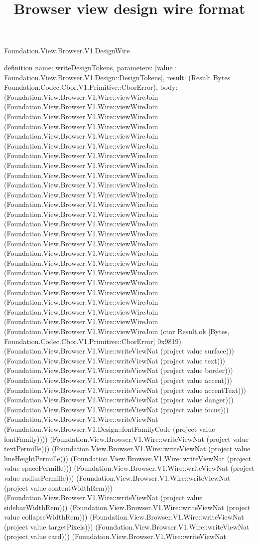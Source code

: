 \begin{lexlean}{Foundation.View.Browser.V1.DesignWire}
\title{Browser view design wire format}
\begin{semanticmodule}
definition{
  name: writeDesignTokens,
  parameters: [value : Foundation.View.Browser.V1.Design::DesignTokens],
  result: (Result Bytes Foundation.Codec.Cbor.V1.Primitive::CborError),
  body: (Foundation.View.Browser.V1.Wire::viewWireJoin (Foundation.View.Browser.V1.Wire::viewWireJoin (Foundation.View.Browser.V1.Wire::viewWireJoin (Foundation.View.Browser.V1.Wire::viewWireJoin (Foundation.View.Browser.V1.Wire::viewWireJoin (Foundation.View.Browser.V1.Wire::viewWireJoin (Foundation.View.Browser.V1.Wire::viewWireJoin (Foundation.View.Browser.V1.Wire::viewWireJoin (Foundation.View.Browser.V1.Wire::viewWireJoin (Foundation.View.Browser.V1.Wire::viewWireJoin (Foundation.View.Browser.V1.Wire::viewWireJoin (Foundation.View.Browser.V1.Wire::viewWireJoin (Foundation.View.Browser.V1.Wire::viewWireJoin (Foundation.View.Browser.V1.Wire::viewWireJoin (Foundation.View.Browser.V1.Wire::viewWireJoin (Foundation.View.Browser.V1.Wire::viewWireJoin (Foundation.View.Browser.V1.Wire::viewWireJoin (Foundation.View.Browser.V1.Wire::viewWireJoin (Foundation.View.Browser.V1.Wire::viewWireJoin (Foundation.View.Browser.V1.Wire::viewWireJoin (Foundation.View.Browser.V1.Wire::viewWireJoin (Foundation.View.Browser.V1.Wire::viewWireJoin (Foundation.View.Browser.V1.Wire::viewWireJoin (Foundation.View.Browser.V1.Wire::viewWireJoin (Foundation.View.Browser.V1.Wire::viewWireJoin (ctor Result.ok [Bytes, Foundation.Codec.Cbor.V1.Primitive::CborError] 0x9819) (Foundation.View.Browser.V1.Wire::writeViewNat (project value surface))) (Foundation.View.Browser.V1.Wire::writeViewNat (project value text))) (Foundation.View.Browser.V1.Wire::writeViewNat (project value border))) (Foundation.View.Browser.V1.Wire::writeViewNat (project value accent))) (Foundation.View.Browser.V1.Wire::writeViewNat (project value accentText))) (Foundation.View.Browser.V1.Wire::writeViewNat (project value danger))) (Foundation.View.Browser.V1.Wire::writeViewNat (project value focus))) (Foundation.View.Browser.V1.Wire::writeViewNat (Foundation.View.Browser.V1.Design::fontFamilyCode (project value fontFamily)))) (Foundation.View.Browser.V1.Wire::writeViewNat (project value textPermille))) (Foundation.View.Browser.V1.Wire::writeViewNat (project value lineHeightPermille))) (Foundation.View.Browser.V1.Wire::writeViewNat (project value spacePermille))) (Foundation.View.Browser.V1.Wire::writeViewNat (project value radiusPermille))) (Foundation.View.Browser.V1.Wire::writeViewNat (project value contentWidthRem))) (Foundation.View.Browser.V1.Wire::writeViewNat (project value sidebarWidthRem))) (Foundation.View.Browser.V1.Wire::writeViewNat (project value collapseWidthRem))) (Foundation.View.Browser.V1.Wire::writeViewNat (project value targetPixels))) (Foundation.View.Browser.V1.Wire::writeViewNat (project value card))) (Foundation.View.Browser.V1.Wire::writeViewNat }
\end{semanticmodule}
\end{lexlean}

